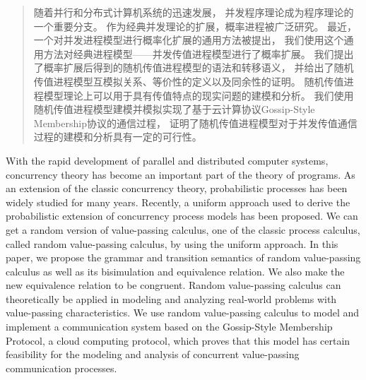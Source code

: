 
\begin{abstract}
  随着并行和分布式计算机系统的迅速发展，
  并发程序理论成为程序理论的一个重要分支。
  作为经典并发理论的扩展，概率进程被广泛研究。
  最近，一个对并发进程模型进行概率化扩展的通用方法被提出，
  我们使用这个通用方法对经典进程模型——并发传值进程模型进行了概率扩展。
  我们提出了概率扩展后得到的随机传值进程模型的语法和转移语义，
  并给出了随机传值进程模型互模拟关系、等价性的定义以及同余性的证明。
  随机传值进程模型理论上可以用于具有传值特点的现实问题的建模和分析。
  我们使用随机传值进程模型建模并模拟实现了基于云计算协议Gossip-Style Membership协议的通信过程，
  证明了随机传值进程模型对于并发传值通信过程的建模和分析具有一定的可行性。
\end{abstract}

\begin{enabstract}
  With the rapid development of parallel and distributed computer systems,
  concurrency theory has become an important part of the theory of programs.
  As an extension of the classic concurrency theory,
  probabilistic processes has been widely studied for many years.
  Recently, a uniform approach used to derive the probabilistic extension of 
  concurrency process models has been proposed.
  We can get a random version of value-passing calculus,
  one of the classic process calculus, called random value-passing calculus, 
  by using the uniform approach.
  In this paper, we propose the grammar and transition semantics of random value-passing calculus
  as well as its bisimulation and equivalence relation.
  We also make the new equivalence relation to be congruent. 
  Random value-passing calculus can theoretically 
  be applied in modeling and analyzing real-world problems with value-passing characteristics.
  We use random value-passing calculus to model and implement
  a communication system based on the Gossip-Style Membership Protocol, a cloud computing protocol,
  which proves that this model has certain feasibility 
  for the modeling and analysis of concurrent value-passing communication processes.
\end{enabstract}
